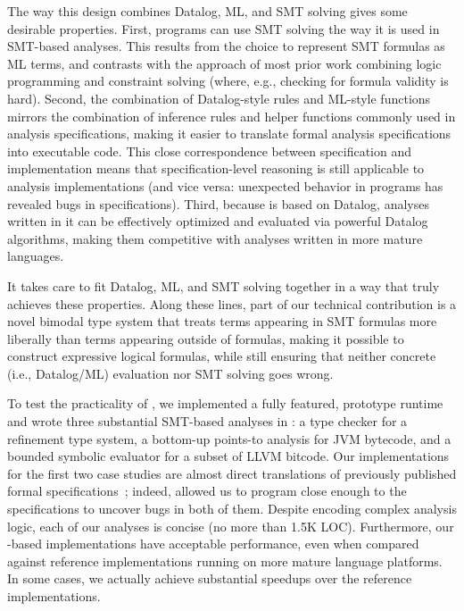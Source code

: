 \documentclass[acmsmall,screen,nonacm]{acmart}
\theoremstyle{definition}
\begin{document}
The way this design combines Datalog, ML, and SMT solving gives \Name some
desirable properties.
First, \Name programs can use SMT solving the way it is used in SMT-based
analyses.
This results from the choice to represent SMT formulas as ML terms, and
contrasts with the approach of most prior work combining logic programming and
constraint solving (where, e.g., checking for formula validity is hard).
Second, the combination of Datalog-style rules and ML-style functions mirrors
the combination of inference rules and helper functions commonly used in
analysis specifications, making it easier to translate formal analysis
specifications into executable code.
This close correspondence between specification and implementation means
that specification-level reasoning is still applicable to analysis
implementations (and vice versa: unexpected behavior in \Name programs has
revealed bugs in specifications).
Third, because \Name is based on Datalog, analyses written in it can be
effectively optimized and evaluated via powerful Datalog algorithms, making
them competitive with analyses written in more mature languages.

It takes care to fit Datalog, ML, and SMT solving together in a way that truly
achieves these properties.
Along these lines, part of our technical contribution is a novel bimodal type
system that treats terms appearing in SMT formulas more liberally than terms
appearing outside of formulas, making it possible to construct expressive
logical formulas, while still ensuring that neither concrete (i.e., Datalog/ML)
evaluation nor SMT solving goes wrong.
\smallskip

To test the practicality of \Name, we implemented a fully featured, prototype
\Name runtime and wrote three substantial SMT-based analyses in \Name: a type
checker for a refinement type system, a bottom-up points-to analysis for JVM
bytecode, and a bounded symbolic evaluator for a subset of LLVM bitcode.
Our implementations for the first two case studies are almost direct
translations of previously published formal
specifications~\citep{dminor,bottomupPointsto}; indeed, \Name allowed us to
program close enough to the specifications to uncover bugs in both of them.
Despite encoding complex analysis logic, each of our analyses is
concise (no more than 1.5K LOC).
Furthermore, our \Name-based implementations have acceptable performance, even
when compared against reference implementations running on more mature language
platforms.
In some cases, we actually achieve substantial speedups over the reference
implementations.
\end{document}
